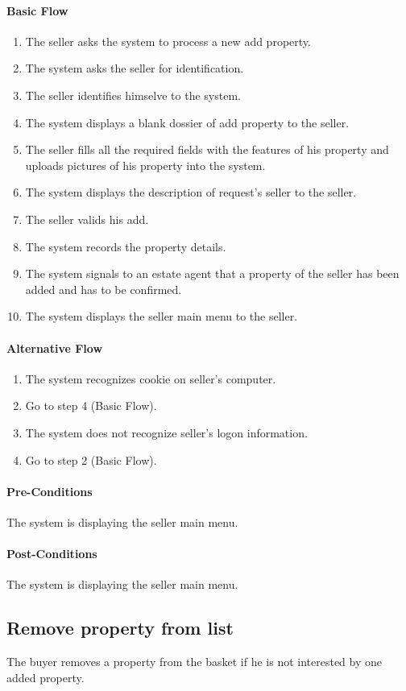 \documentclass[a4paper,12pt]{article}
\begin{document}
\paragraph{Basic Flow}
\begin{enumerate}
\item The seller asks the system to process a new add property.
\item The system asks the seller for identification.
\item The seller identifies himselve to the system.
\item The system displays a blank dossier of add property to the seller.
\item The seller fills all the required fields with the features of his property and uploads pictures of his property into the system.
\item The system displays the description of request's seller to the seller.
\item The seller valids his add.
\item The system records the property details.
\item The system signals to an estate agent that a property of the seller has been added and has to be confirmed.
\item The system displays the seller main menu to the seller.
\end{enumerate}
\paragraph{Alternative Flow}
\begin{enumerate}
\item The system recognizes cookie on seller's computer. 
\item Go to step 4 (Basic Flow).
\item The system does not recognize seller's logon information.
\item Go to step 2 (Basic Flow).
\end{enumerate}
\paragraph{Pre-Conditions}
The system is displaying the seller main menu.
\paragraph{Post-Conditions}
The system is displaying the seller main menu.

\subsection{Remove property from list}
The buyer removes a property from the basket if he is not interested by one added property.
\end{document}
